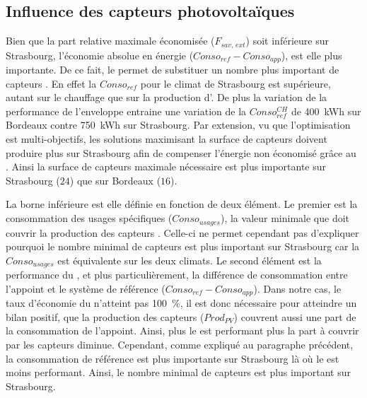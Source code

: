 \subsection{Influence des capteurs photovoltaïques} %
\label{sub:influence_des_capteurs_photovoltaiques}
Bien que la part relative maximale économisée ($F_{sav,\,ext}$) soit inférieure sur
Strasbourg, l’économie absolue en énergie ($Conso_{ref} - Conso_{app}$), est elle plus
importante. De ce fait, le  permet de substituer un nombre plus important de
capteurs . En effet la $Conso_{ref}$ pour le climat de Strasbourg est supérieure,
autant sur le chauffage que sur la production d’. De plus la variation de la
performance de l’enveloppe entraine une variation de la $Conso_{ref}^{CH}$ de
\SI{400}{kWh} sur Bordeaux contre \SI{750}{kWh} sur Strasbourg. Par extension, vu que
l’optimisation est multi-objectifs, les solutions maximisant la surface de capteurs
 doivent produire plus sur Strasbourg afin de compenser l’énergie non économisé
grâce au . Ainsi la surface de capteurs  maximale nécessaire est plus
importante sur Strasbourg ($24$) que sur Bordeaux ($16$).

La borne inférieure est elle définie en fonction de deux élément. Le premier est la
consommation des usages spécifiques ($Conso_{usages}$), la valeur minimale que doit
couvrir la production des capteurs . Celle-ci ne permet cependant pas d’expliquer
pourquoi le nombre minimal de capteurs  est plus important sur Strasbourg car la
$Conso_{usages}$ est équivalente sur les deux climats. Le second élément est la
performance du , et plus particulièrement, la différence de consommation entre
l’appoint et le système de référence ($Conso_{ref} - Conso_{app}$). Dans notre cas, le
taux d’économie du  n’atteint pas \SI{100}{\percent}, il est donc nécessaire pour
atteindre un bilan positif, que la production des capteurs  ($Prod_{PV}$) couvrent
aussi une part de la consommation de l’appoint. Ainsi, plus le  est performant
plus la part à couvrir par les capteurs  diminue. Cependant, comme expliqué au
paragraphe précédent, la consommation de référence est plus importante sur Strasbourg là
où le  est moins performant. Ainsi, le nombre minimal de capteurs  est
plus important sur Strasbourg.

